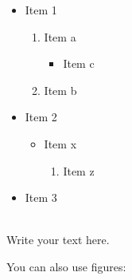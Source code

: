 \documentclass[12pt]{article}
\begin{document}
\begin{itemize}      %
\item Item 1         %
\begin{enumerate}    %
\item Item a         %
\begin{itemize}      %
\item Item c         %
\end{itemize}        %
\item Item b         %
\end{enumerate}      %
\item Item 2         %
\begin{itemize}      %
\item Item x         %
\begin{enumerate}    %
\item Item z         %
\end{enumerate}      %
\end{itemize}        %
\item Item 3         %
\end{itemize}        %

\vskip0.1in
 \\

Write your text here.  


\clearpage %
You can also use figures:
\end{document}
